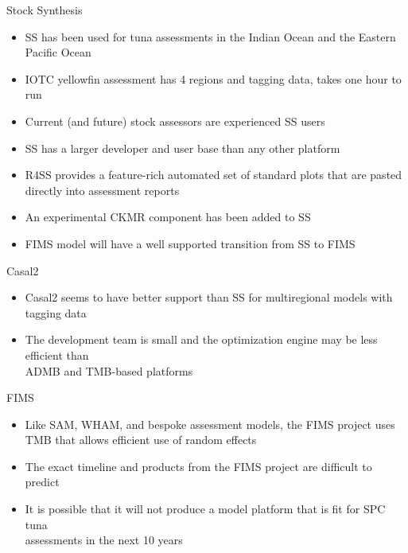 \documentclass[aspectratio=169]{beamer}
\begin{document}
\begin{frame}{Stock Synthesis}\fns
  \begin{itemize}
    \item[] SS has been used for tuna assessments in the Indian Ocean and the
    Eastern Pacific Ocean\\[4ex]
    \item[] IOTC yellowfin assessment has 4 regions and tagging data, takes one
    hour to run\\[4ex]
    \item[] Current (and future) stock assessors are experienced SS users\\[4ex]
    \item[] SS has a larger developer and user base than any other
    platform\\[4ex]
    \item[] R4SS provides a feature-rich automated set of standard plots that
    are pasted directly into assessment reports\\[4ex]
    \item[] An experimental CKMR component has been added to SS\\[4ex]
    \item[] FIMS model will have a well supported transition from SS to
    FIMS\\[4ex]
  \end{itemize}
\end{frame}


\begin{frame}{Casal2}\fns
  \begin{itemize}
    \item[] Casal2 seems to have better support than SS for multiregional models
    with tagging data\\[5ex]
    \item[] The development team is small and the optimization engine may be
    less efficient than\\
    ADMB and TMB-based platforms
  \end{itemize}
\end{frame}


\begin{frame}{FIMS}\fns
  \begin{itemize}
    \item[] Like SAM, WHAM, and bespoke assessment models, the FIMS project uses
    TMB that allows efficient use of random effects\\[5ex]
    \item[] The exact timeline and products from the FIMS project are difficult
    to predict\\[5ex]
    \item[] It is possible that it will not produce a model platform that is fit
    for SPC tuna\\
    assessments in the next 10 years\\[4ex]
  \end{itemize}
\end{frame}
\end{document}
